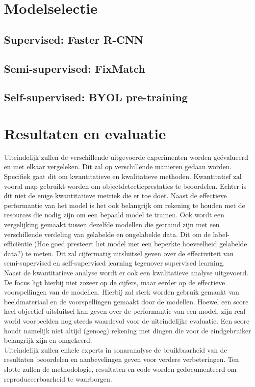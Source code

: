 \section{Modelselectie}

\subsection{Supervised: Faster R-CNN}



\subsection{Semi-supervised: FixMatch}

\subsection{Self-supervised: BYOL pre-training}

\section{Resultaten en evaluatie}

Uiteindelijk zullen de verschillende uitgevoerde experimenten worden geëvalueerd en met elkaar vergeleken. Dit zal op verschillende manieren gedaan worden. Specifiek gaat dit om kwantitatieve en kwalitatieve methoden. Kwantitatief zal vooral \acrfull{map} gebruikt worden om objectdetectieprestaties te beoordelen. Echter is dit niet de enige kwantitatieve metriek die er toe doet. Naast de effectieve performantie van het model is het ook belangrijk om rekening te houden met de resources die nodig zijn om een bepaald model te trainen. Ook wordt een vergelijking gemaakt tussen dezelfde modellen die getraind zijn met een verschillende verdeling van gelabelde en ongelabelde data. Dit om de label-efficiëntie (Hoe goed presteert het model met een beperkte hoeveelheid gelabelde data?) te meten. Dit zal cijfermatig uitsluitsel geven over de effectiviteit van semi-supervised en self-supervised learning tegenover supervised learning. \\

Naast de kwantitatieve analyse wordt er ook een kwalitatieve analyse uitgevoerd. De focus ligt hierbij niet zozeer op de cijfers, maar eerder op de effectieve voorspellingen van de modellen. Hierbij zal sterk worden gebruik gemaakt van beeldmateriaal en de voorspellingen gemaakt door de modellen. Hoewel een score heel objectief uitsluitsel kan geven over de performantie van een model, zijn real-world voorbeelden nog steeds waardevol voor de uiteindelijke evaluatie. Een score houdt namelijk niet altijd (genoeg) rekening met dingen die voor de eindgebruiker belangrijk zijn en omgekeerd. \\

Uiteindelijk zullen enkele experts in sonaranalyse de bruikbaarheid van de resultaten beoordelen en aanbevelingen geven voor verdere verbeteringen. Ten slotte zullen de methodologie, resultaten en code worden gedocumenteerd om reproduceerbaarheid te waarborgen.